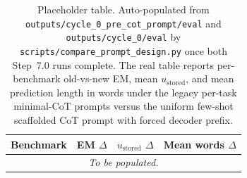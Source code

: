 %
\begin{table}[htbp]
\centering
\small
\caption[Prompt-design ablation at Cycle 0 (placeholder)]%
{Placeholder table. Auto-populated from
\texttt{outputs/cycle\_0\_pre\_cot\_prompt/eval} and
\texttt{outputs/cycle\_0/eval} by
\texttt{scripts/compare\_prompt\_design.py} once both Step~7.0 runs
complete. The real table reports per-benchmark old-vs-new EM, mean
$u_{\text{stored}}$, and mean prediction length in words under the
legacy per-task minimal-CoT prompts versus the uniform few-shot
scaffolded CoT prompt with forced decoder prefix.}
\label{tab:prompt-design-ablation}
\begin{tabular}{lccc}
\toprule
Benchmark & EM $\Delta$ & $u_{\text{stored}}$ $\Delta$ & Mean words $\Delta$ \\
\midrule
\multicolumn{4}{c}{\emph{To be populated.}} \\
\bottomrule
\end{tabular}
\end{table}
